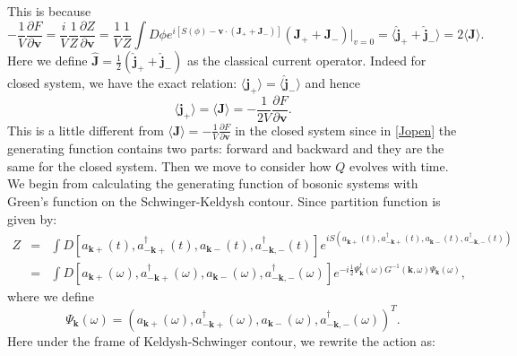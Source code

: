 \documentclass[aps,onecolumn,superscriptaddress,notitlepage,longbibliography]{revtex4-1}
\begin{document}
This is because
\begin{equation}
  - \frac{1}{V} \frac{\partial F}{\partial \mathbf{v}} = \frac{i}{V}
  \frac{1}{Z} \frac{\partial Z}{\partial \mathbf{v}} = \frac{1}{V}
  \frac{1}{Z} \int D \phi e^{i[S (\phi) -\mathbf{v} \cdot (\mathbf{J}_+
  +\mathbf{J}_-)]} (\mathbf{J}_+ +\mathbf{J}_-) |_{v = 0}  =
  \langle \hat{\mathbf{j}}_+ + \hat{\mathbf{j}}_- \rangle = 2 \langle
  \mathbf{J} \rangle .
\end{equation}
Here we define $\hat{\mathbf{J}} = \frac{1}{2} (\hat{\mathbf{j}}_+ +
\hat{\mathbf{j}}_-)$ as the classical current operator. Indeed for closed
system, we have the exact relation: $\langle \mathbf{j}_+ \rangle = \langle
\hat{\mathbf{j}}_- \rangle$ and hence
\begin{equation}
  \langle \mathbf{j}_+ \rangle = \langle \mathbf{J} \rangle = - \frac{1}{2
  V} \frac{\partial F}{\partial \mathbf{v}} . \label{Jopen}
\end{equation}
This is a little different from $\langle \mathbf{J} \rangle = - \frac{1}{V}
\frac{\partial F}{\partial \mathbf{v}}$ in the closed system since in
\eqref{Jopen} the generating function contains two parts: forward and backward and
they are the same for the closed system. Then we move to consider how $Q$
evolves with time. We begin from calculating the generating function of bosonic
systems with Green's function on the Schwinger-Keldysh contour. Since partition function is given by:
\begin{eqnarray}
  Z & = & \int D [a_{\mathbf{k}+} (t), a^{\dagger}_{-\mathbf{k}+}
  (t), a_{\mathbf{k}-} (t), a^{\dagger}_{-\mathbf{k}, -} (t)]
  e^{i S (a_{\mathbf{k}+} (t), a^{\dagger}_{-\mathbf{k}+} (t),
  a_{\mathbf{k}-} (t), a^{\dagger}_{-\mathbf{k}, -} (t))}
  \nonumber\\
  & = & \int D [a_{\mathbf{k}+} (\omega), a^{\dagger}_{-\mathbf{k}+}
  (\omega), a_{\mathbf{k}-} (\omega), a^{\dagger}_{-\mathbf{k}, -}
  (\omega)] e^{-i\frac{1}{2} \Psi_{\mathbf{k}}^{\dagger} (\omega) G^{-
  1} (\mathbf{k}, \omega) \Psi_{\mathbf{k}} (\omega)}, 
\end{eqnarray}
where we define
\begin{equation}
  \Psi_{\mathbf{k}} (\omega) = (a_{\mathbf{k}+} (\omega),
  a^{\dagger}_{-\mathbf{k}+} (\omega), a_{\mathbf{k}-} (\omega),
  a^{\dagger}_{-\mathbf{k}, -} (\omega))^T .
\end{equation}
Here under the frame of Keldysh-Schwinger contour, we rewrite the action as:
\end{document}
